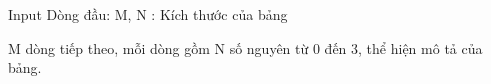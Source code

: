Input
Dòng đầu: M, N : Kích thước của bảng

M dòng tiếp theo, mỗi dòng gồm N số nguyên từ 0 đến 3, thể hiện mô tả của bảng.